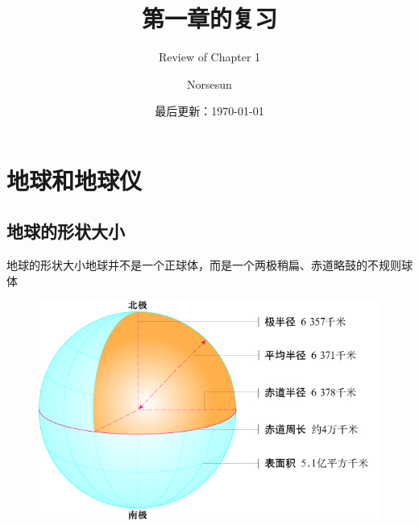\documentclass[10pt]{ctexbeamer}
\author{Norsesun}
\date{最后更新：\today}
\title{第一章的复习}
\subtitle{Review of Chapter 1}
\begin{document}
    \frame{\titlepage}
    \section{地球和地球仪}
    \subsection{地球的形状大小}
    \begin{frame}{地球的形状大小}{地球并不是一个正球体，而是一个两极稍扁、赤道略鼓的不规则球体}
    \begin{figure}
        \includegraphics[width=.79\textwidth]{assets/earth shape.jpg}
    \end{figure}
    \end{frame}
\end{document}
